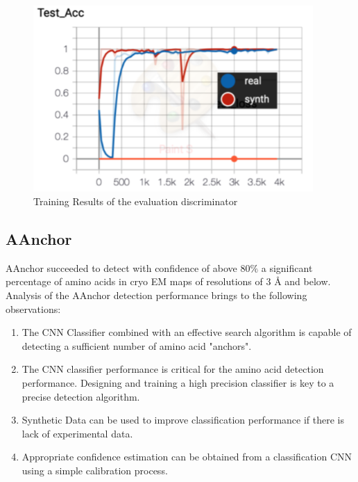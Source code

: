 \begin{figure}[!ht]
\includegraphics[width=0.95\textwidth]{picsnew/dicc_train.png}
\caption{Training Results of the evaluation discriminator }\label{f:disc_train}
\end{figure}

\subsection{AAnchor}
AAnchor \cite{Rozanov2018AAnchor:Maps} succeeded to detect with confidence of above $80 \%$ a significant percentage of amino acids in  cryo EM maps  of resolutions  of $3 $ {\AA}  and below.
Analysis of the AAnchor detection performance brings to the following observations:
\begin{enumerate}
    \item The CNN Classifier combined with an effective search algorithm is capable of detecting a sufficient number of amino acid "anchors".
    \item The  CNN classifier performance is critical for the amino acid detection performance. Designing and training a high precision classifier is key to a precise detection algorithm.
    \item Synthetic Data can be used to improve classification performance if there is  lack of experimental data.
    \item Appropriate confidence estimation can be obtained from a classification CNN using a simple calibration process.
\end{enumerate}

